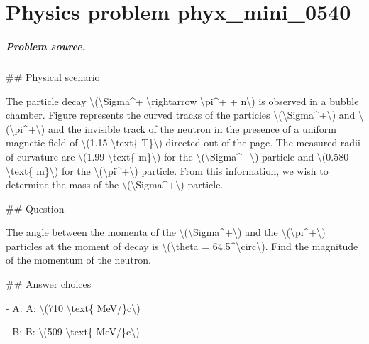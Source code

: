 
\chapter{Physics problem phyx\_mini\_0540}
\label{ch:PhyXMiniProblems_problem_phyx_mini_0540}

\paragraph{Problem source.}
\#\# Physical scenario

The particle decay \textbackslash{}(\textbackslash{}Sigma\textasciicircum{}+ \textbackslash{}rightarrow \textbackslash{}pi\textasciicircum{}+ + n\textbackslash{}) is observed in a bubble chamber. Figure represents the curved tracks of the particles \textbackslash{}(\textbackslash{}Sigma\textasciicircum{}+\textbackslash{}) and \textbackslash{}(\textbackslash{}pi\textasciicircum{}+\textbackslash{}) and the invisible track of the neutron in the presence of a uniform magnetic field of \textbackslash{}(1.15 \textbackslash{}text\{ T\}\textbackslash{}) directed out of the page. The measured radii of curvature are \textbackslash{}(1.99 \textbackslash{}text\{ m\}\textbackslash{}) for the \textbackslash{}(\textbackslash{}Sigma\textasciicircum{}+\textbackslash{}) particle and \textbackslash{}(0.580 \textbackslash{}text\{ m\}\textbackslash{}) for the \textbackslash{}(\textbackslash{}pi\textasciicircum{}+\textbackslash{}) particle. From this information, we wish to determine the mass of the \textbackslash{}(\textbackslash{}Sigma\textasciicircum{}+\textbackslash{}) particle.

\#\# Question

The angle between the momenta of the \textbackslash{}(\textbackslash{}Sigma\textasciicircum{}+\textbackslash{}) and the \textbackslash{}(\textbackslash{}pi\textasciicircum{}+\textbackslash{}) particles at the moment of decay is \textbackslash{}(\textbackslash{}theta = 64.5\textasciicircum{}\textbackslash{}circ\textbackslash{}). Find the magnitude of the momentum of the neutron.

\#\# Answer choices

- A: A: \textbackslash{}(710 \textbackslash{}text\{ MeV/\}c\textbackslash{})

- B: B: \textbackslash{}(509 \textbackslash{}text\{ MeV/\}c\textbackslash{})


